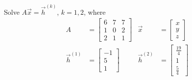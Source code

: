 \begin{Exercise}
Solve $A\vec{x} = \vec{h}^{(k)}$, $k=1,2$, where
\begin{align*}
A &=
\begin{bmatrix}
6 & 7 & 7\\
1 & 0 & 2\\
2 & 1 & 1
\end{bmatrix}
&\vec{x} &=
\begin{bmatrix}
x\\
y\\
z
\end{bmatrix} \\
\vec{h}^{(1)} &=
\begin{bmatrix}
-1 \\
5 \\
1
\end{bmatrix}
& \vec{h}^{(2)} &=
\begin{bmatrix}
\frac{19}{4} \\[3pt]
1 \\[3pt]
\frac{5}{4}
\end{bmatrix}
\end{align*}
\end{Exercise}
